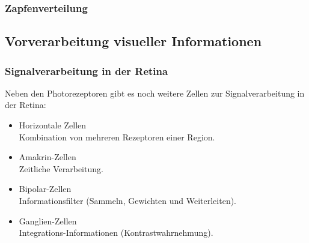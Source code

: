 			\subsubsection{Zapfenverteilung} %

		\subsection{Vorverarbeitung visueller Informationen}
			\subsubsection{Signalverarbeitung in der Retina}
				Neben den Photorezeptoren gibt es noch weitere Zellen zur Signalverarbeitung in der Retina:
				\begin{itemize}
					\item Horizontale Zellen \\ Kombination von mehreren Rezeptoren einer Region.
					\item Amakrin-Zellen \\ Zeitliche Verarbeitung.
					\item Bipolar-Zellen \\ Informationsfilter (Sammeln, Gewichten und Weiterleiten).
					\item Ganglien-Zellen \\ Integrations-Informationen (\zB Kontrastwahrnehmung).
				\end{itemize}

